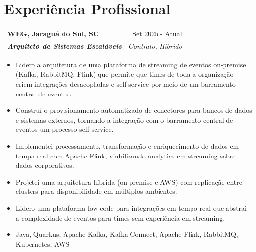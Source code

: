 \documentclass[a4paper,9pt]{extarticle}
\makeatletter
\newcommand{\role}[4]{%
  \begin{tabularx}{\linewidth}{@{}X r@{}}
    \textcolor[HTML]{1C033C}{\textbf{#1}} & \textcolor[HTML]{371e77}{#2} \\[1pt]
    \textcolor[HTML]{371e77}{\textbf{\textit{#3}}} & \textcolor[HTML]{4B28A4}{\textit{#4}} \\
  \end{tabularx}\par\vspace{1pt}%
}
\makeatother
\begin{document}
\section{Experiência Profissional}
\role{WEG, Jaraguá do Sul, SC}{Set 2025 - Atual}{Arquiteto de Sistemas Escaláveis}{Contrato, Híbrido}
\begin{itemize}
    \item Lidero a arquitetura de uma plataforma de streaming de eventos on-premise (Kafka, RabbitMQ, Flink) que permite que times de toda a organização criem integrações desacopladas e self-service por meio de um barramento central de eventos.
    \item Construí o provisionamento automatizado de conectores para bancos de dados e sistemas externos, tornando a integração com o barramento central de eventos um processo self-service.
    \item Implementei processamento, transformação e enriquecimento de dados em tempo real com Apache Flink, viabilizando analytics em streaming sobre dados corporativos.
    \item Projetei uma arquitetura híbrida (on-premise e AWS) com replicação entre clusters para disponibilidade em múltiplos ambientes.
    \item Lidero uma plataforma low-code para integrações em tempo real que abstrai a complexidade de eventos para times sem experiência em streaming.
    \item Java, Quarkus, Apache Kafka, Kafka Connect, Apache Flink, RabbitMQ, Kubernetes, AWS
\end{itemize}
\end{document}
